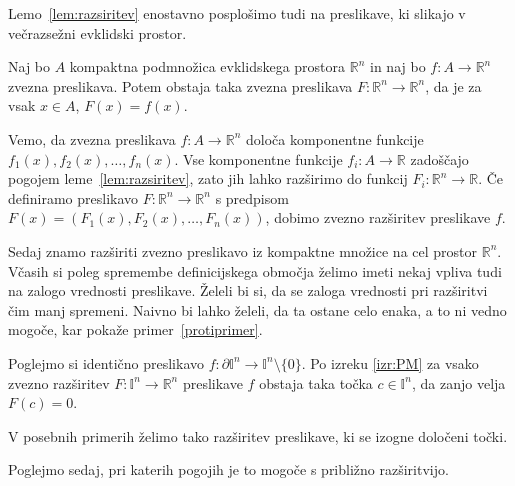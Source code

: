 \documentclass[mat1]{fmfdelo}
\newcommand{\R}{\mathbb R}
\newcommand{\I}{\mathbb I}
\newcommand{\0}{0}
\newcommand{\pU}{\mathcal U}
\begin{document}
Lemo~\ref{lem:razsiritev} enostavno posplošimo tudi na preslikave, ki slikajo v večrazsežni evklidski prostor.

\begin{posledica}
Naj bo $A$ kompaktna podmnožica evklidskega prostora $\R^n$ in naj bo \mbox{$f : A \to \R^n$} zvezna preslikava. Potem obstaja taka zvezna preslikava $F : \R^n \to \R^n$, da je za vsak $x \in A$, $F(x) = f(x)$.
\end{posledica}

\begin{dokaz}
Vemo, da zvezna preslikava $f : A \to \R^n$ določa komponentne funkcije $f_1(x), f_2(x), \dots , f_n(x)$. Vse komponentne funkcije $f_i : A \to \R$ zadoščajo pogojem leme~\ref{lem:razsiritev}, zato jih lahko razširimo do funkcij $F_i : \R^n \to \R$. Če definiramo preslikavo $F : \R^n \to \R^n$ s predpisom $F(x) = (F_1(x), F_2(x), \dots , F_n(x))$, dobimo zvezno razširitev preslikave $f$.
\end{dokaz}
Sedaj znamo razširiti zvezno preslikavo iz kompaktne množice na cel prostor $\R^n$. Včasih si poleg spremembe definicijskega območja želimo imeti nekaj vpliva tudi na zalogo vrednosti preslikave. Želeli bi si, da se zaloga vrednosti pri razširitvi čim manj spremeni. Naivno bi lahko želeli, da ta ostane celo enaka, a to ni vedno mogoče, kar pokaže primer~\ref{protiprimer}.

\begin{primer}\label{protiprimer}
Poglejmo si identično preslikavo $f : \partial \I^n \to \I^n \setminus \{ \0 \}$. Po izreku \ref{izr:PM} za vsako zvezno razširitev $F : \I^n \to \R^n$ preslikave $f$ obstaja taka točka $c \in \I^n$, da zanjo velja $F(c) = 0$.
\end{primer}

V posebnih primerih želimo tako razširitev preslikave, ki se izogne določeni točki.

Poglejmo sedaj, pri katerih pogojih je to mogoče s približno razširitvijo.

\end{document}
